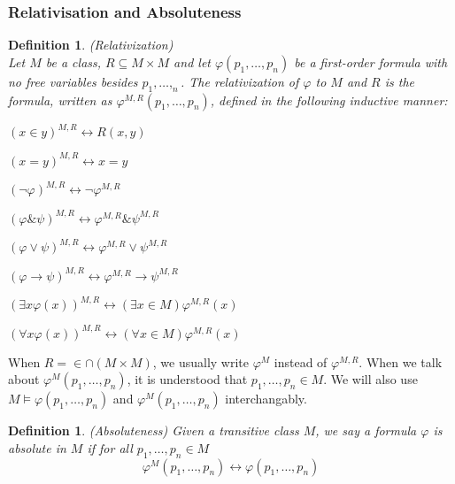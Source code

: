 \documentclass[12pt,a4paper]{article}
\newtheorem{definition}[theorem]{Definition}
\renewcommand{\iff}{\leftrightarrow}
\newcommand{\then}{\rightarrow}
\newcommand{\bce}{\begin{compactenum}}
\newcommand{\ece}{\end{compactenum}}
\newcommand{\et}{\mathrel{\&}}
\begin{document}
\subsubsection{Relativisation and Absoluteness}
\begin{definition}{(Relativization)}\label{def:relativization}\\
Let $M$ be a class, $R \subseteq M\times M$ and let $\varphi(p_1, \ldots, p_n)$ be a first-order formula with no free variables besides $p_1, \ldots, _n$. 
The \emph{relativization of $\varphi$ to $M$ and $R$} is the formula, written as $\varphi^{M, R}(p_1, \ldots, p_n)$, defined in the following inductive manner:
\bce[(i)]
\item $(x \in y)^{M,R} \iff R(x, y)$
\item $(x = y)^{M,R} \iff x = y$
\item $(\neg \varphi)^{M,R} \iff \neg \varphi^{M,R}$
\item $(\varphi \et \psi)^{M,R} \iff \varphi^{M,R} \et \psi^{M,R}$
\item $(\varphi \lor \psi)^{M,R} \iff \varphi^{M,R} \lor \psi^{M,R}$
\item $(\varphi \then \psi)^{M,R} \iff \varphi^{M,R} \then \psi^{M,R}$
\item $(\exists x \varphi(x))^{M,R} \iff (\exists x \in M) \varphi^{M,R}(x)$
\item $(\forall x \varphi(x))^{M,R} \iff (\forall x \in M) \varphi^{M,R}(x)$
\ece
\end{definition}
When $R=\in\cap(M \times M)$, we usually write $\varphi^M$ instead of $\varphi^{M, R}$. When we talk about $\varphi^M(p_1, \ldots, p_n)$, it is understood that $p_1, \ldots, p_n \in M$.
We will also use $M \models \varphi(p_1, \ldots, p_n)$ and $\varphi^M(p_1, \ldots, p_n)$ interchangably.

\begin{definition}{(Absoluteness)}
Given a transitive class $M$, we say a formula $\varphi$ is \emph{absolute in $M$} if for all $p_1, \ldots, p_n \in M$
\begin{equation}
\varphi^M(p_1, \ldots, p_n) \iff \varphi(p_1, \ldots, p_n)
\end{equation}
\end{definition}
\end{document}
